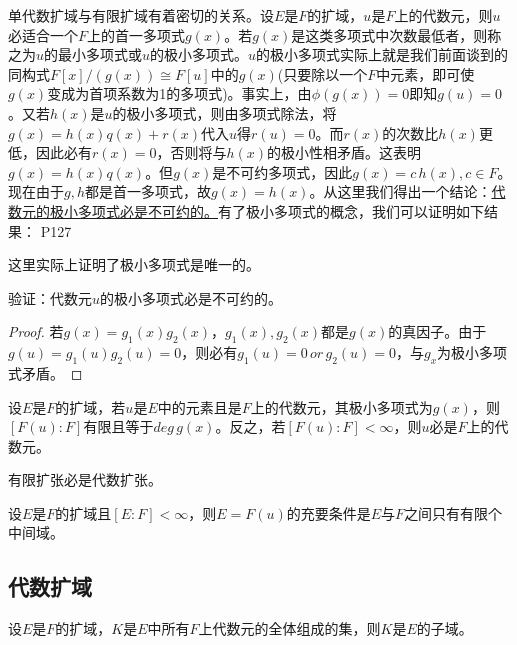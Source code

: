 \original
{
	单代数扩域与有限扩域有着密切的关系。设$E$是$F$的扩域，$u$是$F$上的代数元，则$u$必适合一个$F$上的首一多项式$g(x)$。若$g(x)$是这类多项式中次数最低者，则称之为$u$的最小多项式或$u$的极小多项式。$u$的极小多项式实际上就是我们前面谈到的同构式$F[x]/(g(x))\cong F[u]$中的$g(x)$(只要除以一个$F$中元素，即可使$g(x)$变成为首项系数为1的多项式)。事实上，由$\phi(g(x))=0$即知$g(u)=0$。又若$h(x)$是$u$的极小多项式，则由多项式除法，将$g(x)=h(x)q(x)+r(x)$代入$u$得$r(u)=0$。而$r(x)$的次数比$h(x)$更低，因此必有$r(x)=0$，否则将与$h(x)$的极小性相矛盾。这表明$g(x)=h(x)q(x)$。但$g(x)$是不可约多项式，因此$g(x)=c\,h(x),c\in F$。现在由于$g,h$都是首一多项式，故$g(x)=h(x)$。从这里我们得出一个结论：\uline{代数元的极小多项式必是不可约的。}有了极小多项式的概念，我们可以证明如下结果：
}
{P127}
\begin{remark}
	这里实际上证明了极小多项式是唯一的。
\end{remark}
\begin{proposition}
	验证：代数元$u$的极小多项式必是不可约的。
\end{proposition}

\begin{proof}
	若$g(x)=g_{1}(x)g_{2}(x)$，$g_{1}(x),g_{2}(x)$都是$g(x)$的真因子。由于$g(u)=g_{1}(u)g_{2}(u)=0$，则必有$g_{1}(u)=0\, or\, g_{2}(u)=0$，与$g_{x}$为极小多项式矛盾。
\end{proof}


\begin{theorem}
	设$E$是$F$的扩域，若$u$是$E$中的元素且是$F$上的代数元，其极小多项式为$g(x)$，则$[F(u):F]$有限且等于$deg \, g(x)$。反之，若$[F(u):F]<\infty$，则$u$必是$F$上的代数元。
\end{theorem}

\begin{corollary}
	有限扩张必是代数扩张。
\end{corollary}

\begin{theorem}[Steinitz定理]
	设$E$是$F$的扩域且$[E:F]<\infty$，则$E=F(u)$的充要条件是$E$与$F$之间只有有限个中间域。
\end{theorem}


\subsection{代数扩域}

\begin{theorem}
	设$E$是$F$的扩域，$K$是$E$中所有$F$上代数元的全体组成的集，则$K$是$E$的子域。
\end{theorem}

